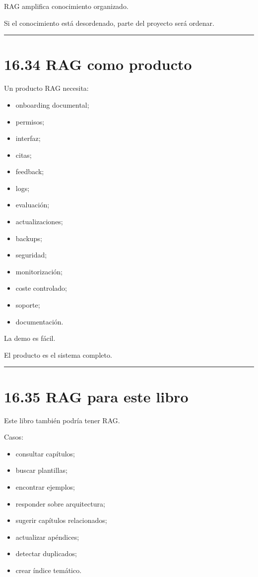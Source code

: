 RAG amplifica conocimiento organizado.

Si el conocimiento está desordenado, parte del proyecto será ordenar.

\begin{center}\rule{0.5\linewidth}{0.5pt}\end{center}

\section{16.34 RAG como producto}\label{rag-como-producto}

Un producto RAG necesita:

\begin{itemize}
\tightlist
\item
  onboarding documental;
\item
  permisos;
\item
  interfaz;
\item
  citas;
\item
  feedback;
\item
  logs;
\item
  evaluación;
\item
  actualizaciones;
\item
  backups;
\item
  seguridad;
\item
  monitorización;
\item
  coste controlado;
\item
  soporte;
\item
  documentación.
\end{itemize}

La demo es fácil.

El producto es el sistema completo.

\begin{center}\rule{0.5\linewidth}{0.5pt}\end{center}

\section{16.35 RAG para este libro}\label{rag-para-este-libro}

Este libro también podría tener RAG.

Casos:

\begin{itemize}
\tightlist
\item
  consultar capítulos;
\item
  buscar plantillas;
\item
  encontrar ejemplos;
\item
  responder sobre arquitectura;
\item
  sugerir capítulos relacionados;
\item
  actualizar apéndices;
\item
  detectar duplicados;
\item
  crear índice temático.
\end{itemize}

